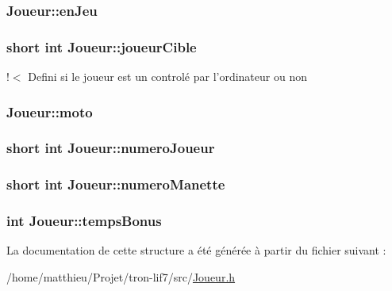 \hypertarget{structJoueur_a83e062c54d98b446e0bb30a93d23f2fd}{
\subsubsection[{en\-Jeu}]{ Joueur\-::en\-Jeu}}\label{structJoueur_a83e062c54d98b446e0bb30a93d23f2fd}
\hypertarget{structJoueur_a7672ceecb63c257cf2d9a659662620fc}{
\subsubsection[{joueur\-Cible}]{\setlength{\rightskip}{0pt plus 5cm}short int Joueur\-::joueur\-Cible}}\label{structJoueur_a7672ceecb63c257cf2d9a659662620fc}
!$<$ Defini si le joueur est un controlé par l'ordinateur ou non \hypertarget{structJoueur_ac2768294956259e01d0744d6db789fe2}{
\subsubsection[{moto}]{ Joueur\-::moto}}\label{structJoueur_ac2768294956259e01d0744d6db789fe2}
\hypertarget{structJoueur_a16d5323b40b813198386623075de9fa1}{
\subsubsection[{numero\-Joueur}]{\setlength{\rightskip}{0pt plus 5cm}short int Joueur\-::numero\-Joueur}}\label{structJoueur_a16d5323b40b813198386623075de9fa1}
\hypertarget{structJoueur_aab4fb5652b29a6bdfc5dff4ed4dbe8da}{
\subsubsection[{numero\-Manette}]{\setlength{\rightskip}{0pt plus 5cm}short int Joueur\-::numero\-Manette}}\label{structJoueur_aab4fb5652b29a6bdfc5dff4ed4dbe8da}
\hypertarget{structJoueur_a924a294aef342302f978bc900cfdb98a}{
\subsubsection[{temps\-Bonus}]{\setlength{\rightskip}{0pt plus 5cm}int Joueur\-::temps\-Bonus}}\label{structJoueur_a924a294aef342302f978bc900cfdb98a}


La documentation de cette structure a été générée à partir du fichier suivant \-:\begin{DoxyCompactItemize}
\item 
/home/matthieu/\-Projet/tron-\/lif7/src/\hyperlink{Joueur_8h}{Joueur.\-h}\end{DoxyCompactItemize}
